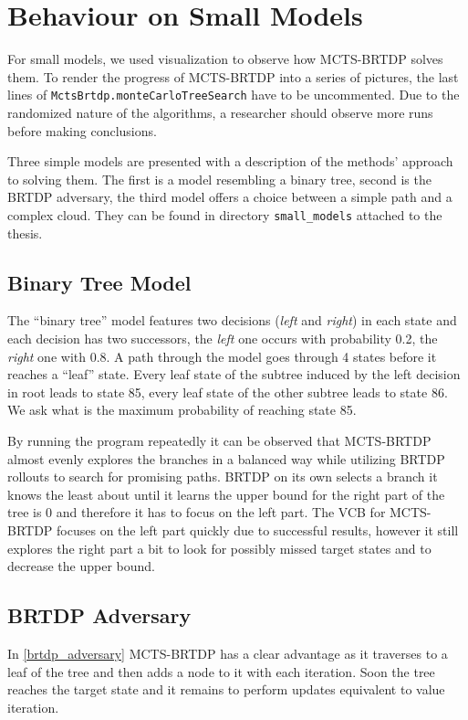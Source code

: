 \section{Behaviour on Small Models}

For small models, we used visualization to observe how MCTS-BRTDP solves
them. To render the progress of MCTS-BRTDP into a series of pictures,
the last lines of \verb|MctsBrtdp.monteCarloTreeSearch| have to be
uncommented.  Due to the randomized nature of the algorithms,
a researcher should observe more runs before making conclusions.

Three simple models are presented with a description of the methods'
approach to solving them.
The first is a model resembling a binary tree, second is
the BRTDP adversary, the third model offers a choice between a simple
path and a complex cloud. They can be found in directory
\verb|small_models| attached to the thesis.

\subsection*{Binary Tree Model}

The ``binary tree'' model features two decisions ({\em left} and {\em
right}) in each state and each decision has two successors,
the {\em left} one occurs with probability 0.2,
the {\em right} one with 0.8. A path through the model goes through 4 states
before it reaches a ``leaf'' state. Every leaf state of the subtree
induced by the left decision in root leads to state 85, every leaf state
of the other subtree leads to state 86. We ask what is the maximum
probability of reaching state 85.

By running the program repeatedly it can be observed that MCTS-BRTDP
almost evenly explores the branches in a balanced way while utilizing
BRTDP rollouts to search for promising paths. BRTDP on its own
selects a branch it knows the least about until it learns the upper bound
for the right part of the tree is 0 and therefore it has to focus on the
left part. The VCB for MCTS-BRTDP focuses on the left part quickly due
to successful results, however it still explores the right part a bit to
look for possibly missed target states and to decrease the upper bound.

\subsection*{BRTDP Adversary}

In \autoref{brtdp_adversary} MCTS-BRTDP has a clear advantage as it
traverses to a leaf of the tree and then adds a node to it with each iteration.
Soon the tree reaches the target state and it remains to perform updates
equivalent to value iteration.



